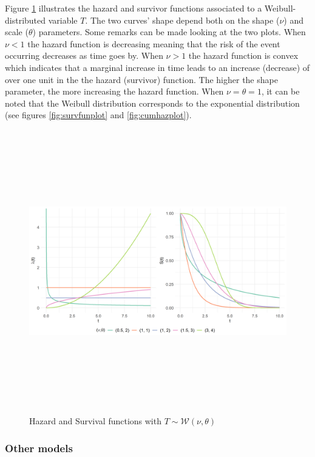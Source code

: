\documentclass[
]{book}
\begin{document}
Figure \ref{fig:weibullplots} illustrates the hazard and survivor functions associated to a Weibull-distributed variable \(T\). The two curves' shape depend both on the shape (\(\nu\)) and scale (\(\theta\)) parameters. Some remarks can be made looking at the two plots. When \(\nu < 1\) the hazard function is decreasing meaning that the risk of the event occurring decreases as time goes by. When \(\nu > 1\) the hazard function is convex which indicates that a marginal increase in time leads to an increase (decrease) of over one unit in the the hazard (survivor) function. The higher the shape parameter, the more increasing the hazard function. When \(\nu = \theta = 1\), it can be noted that the Weibull distribution corresponds to the exponential distribution (see figures \ref{fig:survfunplot} and \ref{fig:cumhazplot}).

\begin{figure}

{\centering \includegraphics[width=700pt,height=350pt]{./imgs/weibull_plots} 

}

\caption{Hazard and Survival functions with $T \sim \mathcal{W} (\nu, \theta)$}\label{fig:weibullplots}
\end{figure}

\hypertarget{other-models}{%
\subsubsection*{Other models}\label{other-models}}
\end{document}
